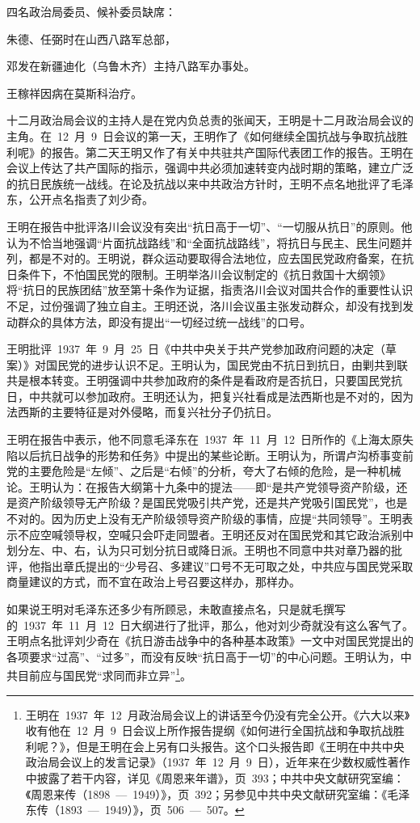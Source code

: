 四名政治局委员、候补委员缺席：

朱德、任弼时在山西八路军总部，

邓发在新疆迪化（乌鲁木齐）主持八路军办事处。

王稼祥因病在莫斯科治疗。

十二月政治局会议的主持人是在党内负总责的张闻天，王明是十二月政治局会议的主角。在~12~月~9~日会议的第一天，王明作了《如何继续全国抗战与争取抗战胜利呢》的报告。第二天王明又作了有关中共驻共产国际代表团工作的报告。王明在会议上传达了共产国际的指示，强调中共必须加速转变内战时期的策略，建立广泛的抗日民族统一战线。在论及抗战以来中共政治方针时，王明不点名地批评了毛泽东，公开点名指责了刘少奇。

王明在报告中批评洛川会议没有突出“抗日高于一切”、“一切服从抗日”的原则。他认为不恰当地强调“片面抗战路线”和“全面抗战路线”，将抗日与民主、民生问题并列，都是不对的。王明说，群众运动要取得合法地位，应去国民党政府备案，在抗日条件下，不怕国民党的限制。王明举洛川会议制定的《抗日救国十大纲领》将“抗日的民族团结”放至第十条作为证据，指责洛川会议对国共合作的重要性认识不足，过份强调了独立自主。王明还说，洛川会议虽主张发动群众，却没有找到发动群众的具体方法，即没有提出“一切经过统一战线”的口号。

王明批评~1937~年~9~月~25~日《中共中央关于共产党参加政府问题的决定（草案）》对国民党的进步认识不足。王明认为，国民党由不抗日到抗日，由剿共到联共是根本转变。王明强调中共参加政府的条件是看政府是否抗日，只要国民党抗日，中共就可以参加政府。王明还认为，把复兴社看成是法西斯也是不对的，因为法西斯的主要特征是对外侵略，而复兴社分子仍抗日。

王明在报告中表示，他不同意毛泽东在~1937~年~11~月~12~日所作的《上海太原失陷以后抗日战争的形势和任务》中提出的某些论断。王明认为，所谓卢沟桥事变前党的主要危险是“左倾”、之后是“右倾”的分析，夸大了右倾的危险，是一种机械论。王明认为：在报告大纲第十九条中的提法——即“是共产党领导资产阶级，还是资产阶级领导无产阶级？是国民党吸引共产党，还是共产党吸引国民党”，也是不对的。因为历史上没有无产阶级领导资产阶级的事情，应提“共同领导”。王明表示不应空喊领导权，空喊只会吓走同盟者。王明还反对在国民党和其它政治派别中划分左、中、右，认为只可划分抗日或降日派。王明也不同意中共对章乃器的批评，他指出章氏提出的“少号召、多建议”口号不无可取之处，中共应与国民党采取商量建议的方式，而不宜在政治上号召要这样办，那样办。

如果说王明对毛泽东还多少有所顾忌，未敢直接点名，只是就毛撰写的~1937~年~11~月~12~日大纲进行了批评，那么，他对刘少奇就没有这么客气了。王明点名批评刘少奇在《抗日游击战争中的各种基本政策》一文中对国民党提出的各项要求“过高”、“过多”，而没有反映“抗日高于一切”的中心问题。王明认为，中共目前应与国民党“求同而非立异”\footnote{王明在~1937~年~12~月政治局会议上的讲话至今仍没有完全公开。《六大以来》收有他在~12~月~9~日会议上所作报告提纲《如何进行全国抗战和争取抗战胜利呢？》，但是王明在会上另有口头报告。这个口头报告即《王明在中共中央政治局会议上的发言记录》（1937~年~12~月~9~日），近年来在少数权威性著作中披露了若干内容，详见《周恩来年谱》，页~393；中共中央文献研究室编：《周恩来传（1898~—~1949）》，页~392；另参见中共中央文献研究室编：《毛泽东传（1893~—~1949）》，页~506~—~507。}。

